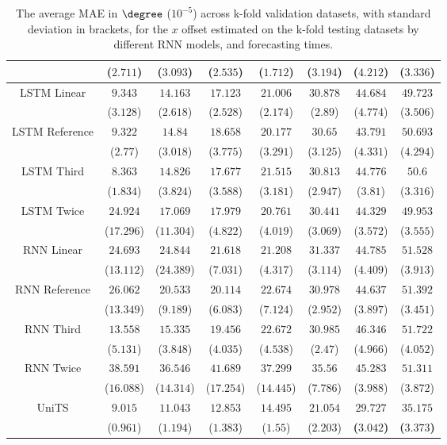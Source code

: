 \begin{table}[!ht]
{\begin{tabular}{|c|c|c|c|c|c|c|c|}
			 & ($2.711$) & ($3.093$) & ($2.535$) & ($1.712$) & ($3.194$) & ($4.212$) & ($3.336$) \\ \hline
			\multirow{2}{*}{LSTM Linear} & $9.343$ & $14.163$ & $17.123$ & $21.006$ & $30.878$ & $44.684$ & $49.723$ \\
			 & ($3.128$) & ($2.618$) & ($2.528$) & ($2.174$) & ($2.89$) & ($4.774$) & ($3.506$) \\ \hline
			\multirow{2}{*}{LSTM Reference} & $9.322$ & $14.84$ & $18.658$ & $20.177$ & $30.65$ & $43.791$ & $50.693$ \\
			 & ($2.77$) & ($3.018$) & ($3.775$) & ($3.291$) & ($3.125$) & ($4.331$) & ($4.294$) \\ \hline
			\multirow{2}{*}{LSTM Third} & $8.363$ & $14.826$ & $17.677$ & $21.515$ & $30.813$ & $44.776$ & $50.6$ \\
			 & ($1.834$) & ($3.824$) & ($3.588$) & ($3.181$) & ($2.947$) & ($3.81$) & ($3.316$) \\ \hline
			\multirow{2}{*}{LSTM Twice} & $24.924$ & $17.069$ & $17.979$ & $20.761$ & $30.441$ & $44.329$ & $49.953$ \\
			 & ($17.296$) & ($11.304$) & ($4.822$) & ($4.019$) & ($3.069$) & ($3.572$) & ($3.555$) \\ \hline
			\multirow{2}{*}{RNN Linear} & $24.693$ & $24.844$ & $21.618$ & $21.208$ & $31.337$ & $44.785$ & $51.528$ \\
			 & ($13.112$) & ($24.389$) & ($7.031$) & ($4.317$) & ($3.114$) & ($4.409$) & ($3.913$) \\ \hline
			\multirow{2}{*}{RNN Reference} & $26.062$ & $20.533$ & $20.114$ & $22.674$ & $30.978$ & $44.637$ & $51.392$ \\
			 & ($13.349$) & ($9.189$) & ($6.083$) & ($7.124$) & ($2.952$) & ($3.897$) & ($3.451$) \\ \hline
			\multirow{2}{*}{RNN Third} & $13.558$ & $15.335$ & $19.456$ & $22.672$ & $30.985$ & $46.346$ & $51.722$ \\
			 & ($5.131$) & ($3.848$) & ($4.035$) & ($4.538$) & ($2.47$) & ($4.966$) & ($4.052$) \\ \hline
			\multirow{2}{*}{RNN Twice} & $38.591$ & $36.546$ & $41.689$ & $37.299$ & $35.56$ & $45.283$ & $51.311$ \\
			 & ($16.088$) & ($14.314$) & ($17.254$) & ($14.445$) & ($7.786$) & ($3.988$) & ($3.872$) \\ \hline
			\multirow{2}{*}{UniTS} & $9.015$ & $11.043$ & $12.853$ & $14.495$ & $21.054$ & $\mathbf{29.727}$ & $\mathbf{35.175}$ \\
			 & ($0.961$) & ($1.194$) & ($1.383$) & ($1.55$) & ($2.203$) & \textbf{(}$\mathbf{3.042}$\textbf{)} & \textbf{(}$\mathbf{3.373}$\textbf{)} \\ \hline
		\end{tabular}
	}
	\caption{The average MAE in $\degree$ ($10^{-5}$) across k-fold validation datasets, with standard deviation in brackets, for the $x$ offset estimated on the k-fold testing datasets by different RNN models, and forecasting times.}
	\label{tab:all_longitude_no_abs_MAE}
\end{table}